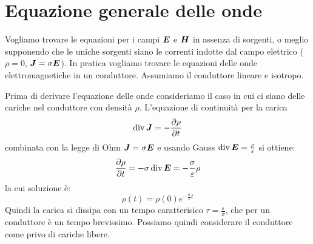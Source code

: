 \section{Equazione generale delle onde}
Vogliamo trovare le equazioni per i campi $\boldsymbol{E}$ e $\boldsymbol{H}$ in assenza di sorgenti, o meglio supponendo che le uniche sorgenti siano le correnti indotte dal campo elettrico ($\rho=0$, $\boldsymbol{J}=\sigma\boldsymbol{E}$). In pratica vogliamo trovare le equazioni delle onde elettromagnetiche in un conduttore. Assumiamo il conduttore lineare e isotropo.

Prima di derivare l'equazione delle onde consideriamo il caso in cui ci siano delle cariche nel conduttore con densità $\rho$. L'equazione di continuità per la carica
\[
  \operatorname{div} \boldsymbol{J} = -\frac{\partial \rho}{\partial t}
\]
combinata con la legge di Ohm $\boldsymbol{J} = \sigma \boldsymbol{E}$ e usando Gauss $\operatorname{div} \boldsymbol{E} = \frac{\rho}{\varepsilon}$ si ottiene:
\[
  \frac{\partial \rho}{\partial t} = -\sigma \operatorname{div}\boldsymbol{E} = -\frac{\sigma}{\varepsilon}\rho
\]
la cui soluzione è:
\[
  \rho(t) = \rho(0)e^{-\frac{\sigma}{\varepsilon}t}
\]
Quindi la carica si dissipa con un tempo caratterisico $\tau = \frac{\varepsilon}{\sigma}$, che per un conduttore è un tempo brevissimo. Possiamo quindi considerare il conduttore come privo di cariche libere.

